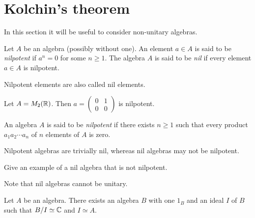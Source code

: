 \section{Kolchin's theorem}
\label{Kolchin}

In this section it will be useful to consider 
non-unitary algebras. 

\begin{definition}
    Let $A$ be an algebra (possibly without one). An element $a\in A$
    is said to be \emph{nilpotent} if 
    $a^n=0$ for some $n\geq1$. The algebra $A$ is said to be
    \emph{nil} if every element $a\in A$ is nilpotent. 
\end{definition}

Nilpotent elements are also called nil elements.  

\begin{example}
    Let $A=M_2(\mathbb{R})$. Then $a=\begin{pmatrix}0&1\\0&0\end{pmatrix}$ is nilpotent. 
\end{example}

\begin{definition}
    An algebra $A$ is said to be \emph{nilpotent} if there exists
    $n\geq1$ such that every product 
    $a_1a_2\cdots a_n$
    of $n$ elements of $A$ is zero. 
\end{definition}

Nilpotent algebras are trivially nil, whereas nil algebras may not be nilpotent.

\begin{exercise}
    Give an example of a nil algebra that is not nilpotent. 
\end{exercise}

Note that nil algebras cannot be unitary. 

\begin{exercise}
\label{xca:unit}
    Let $A$ be an algebra. There exists an algebra $B$ 
    with one $1_B$ and an ideal $I$ of $B$ 
    such that $B/I\simeq\mathbb{C}$ and $I\simeq A$. 
\end{exercise}


